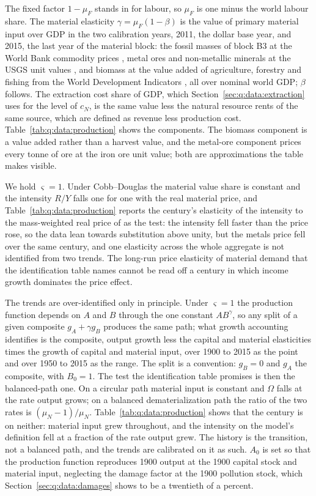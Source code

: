 The fixed factor $1-\mu_F$ stands in for labour, so $\mu_F$ is one minus the world labour share. The material elasticity $\gamma=\mu_F\left(1-\beta\right)$ is the value of primary material input over GDP in the two calibration years, 2011, the dollar base year, and 2015, the last year of the material block: the fossil masses of block B3 at the World Bank commodity prices \parencite{worldbank2026cmo}, metal ores and non-metallic minerals at the USGS unit values \parencite{usgs2024ds140}, and biomass at the value added of agriculture, forestry and fishing from the World Development Indicators \parencite{worldbank2026wdi}, all over nominal world GDP; $\beta$ follows. The extraction cost share of GDP, which Section~\ref{sec:q:data:extraction} uses for the level of $c_N$, is the same value less the natural resource rents of the same source, which are defined as revenue less production cost. Table~\ref{tab:q:data:production} shows the components. The biomass component is a value added rather than a harvest value, and the metal-ore component prices every tonne of ore at the iron ore unit value; both are approximations the table makes visible.

We hold $\varsigma=1$. Under Cobb--Douglas the material value share is constant and the intensity $R/Y$ falls one for one with the real material price, and Table~\ref{tab:q:data:production} reports the century's elasticity of the intensity to the mass-weighted real price of \textcite{jacks2019} as the test: the intensity fell faster than the price rose, so the data lean towards substitution above unity, but the metals price fell over the same century, and one elasticity across the whole aggregate is not identified from two trends. The long-run price elasticity of material demand that the identification table names cannot be read off a century in which income growth dominates the price effect.

The trends are over-identified only in principle. Under $\varsigma=1$ the production function depends on $A$ and $B$ through the one constant $AB^{\gamma}$, so any split of a given composite $g_A+\gamma g_B$ produces the same path; what growth accounting identifies is the composite, output growth less the capital and material elasticities times the growth of capital and material input, over 1900 to 2015 as the point and over 1950 to 2015 as the range. The split is a convention: $g_B=0$ and $g_A$ the composite, with $B_0=1$. The test the identification table promises is then the balanced-path one. On a circular path material input is constant and $\Omega$ falls at the rate output grows; on a balanced dematerialization path the ratio of the two rates is $\left(\mu_N-1\right)/\mu_N$. Table~\ref{tab:q:data:production} shows that the century is on neither: material input grew throughout, and the intensity on the model's definition fell at a fraction of the rate output grew. The history is the transition, not a balanced path, and the trends are calibrated on it as such. $A_0$ is set so that the production function reproduces 1900 output at the 1900 capital stock and material input, neglecting the damage factor at the 1900 pollution stock, which Section~\ref{sec:q:data:damages} shows to be a twentieth of a percent.

